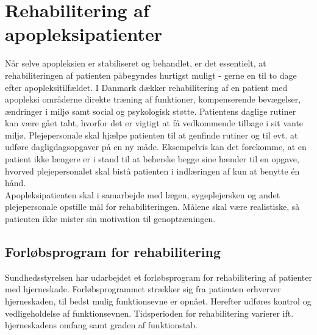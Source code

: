 \section{Rehabilitering af apopleksipatienter}\label{Rehabilitering}
Når selve apopleksien er stabiliseret og behandlet, er det essentielt, at rehabiliteringen af patienten påbegyndes hurtigst muligt - gerne en til to dage efter apopleksitilfældet. I Danmark dækker rehabilitering af en patient med apopleksi områderne direkte træning af funktioner, kompenserende bevægelser, ændringer i miljø samt social og psykologisk støtte. Patientens daglige rutiner kan være gået tabt, hvorfor det er vigtigt at få vedkommende tilbage i sit vante miljø. Plejepersonale skal hjælpe patienten til at genfinde rutiner og til evt. at udføre dagligdagsopgaver på en ny måde. Eksempelvis kan det forekomme, at en patient ikke længere er i stand til at beherske begge sine hænder til en opgave, hvorved plejepersonalet skal bistå patienten i indlæringen af kun at benytte én hånd. \cite{Kruuse2015} \\
Apopleksipatienten skal i samarbejde med lægen, sygeplejersken og andet plejepersonale opstille mål for rehabiliteringen. Målene skal være realistiske, så patienten ikke mister sin motivation til genoptræningen. \cite{Kruuse2015}

\subsection{Forløbsprogram for rehabilitering}\label{Faser}
Sundhedsstyrelsen har udarbejdet et forløbsprogram for rehabilitering af patienter med hjerneskade. Forløbsprogrammet strækker sig fra patienten erhverver hjerneskaden, til bedst mulig funktionsevne er opnået. Herefter udføres kontrol og vedligeholdelse af funktionsevnen. Tidsperioden for rehabilitering varierer ift. hjerneskadens omfang samt graden af funktionstab. \cite{Sundhedsstyrelsen2011a}

